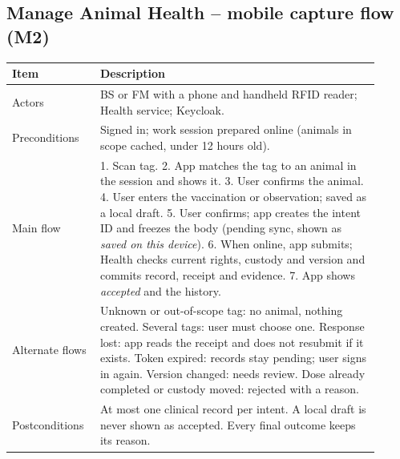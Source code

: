 \subsection*{Manage Animal Health -- mobile capture flow (M2)}

{\small
\begin{longtable}{|p{0.20\linewidth}|p{0.71\linewidth}|}
\hline
\textbf{Item} & \textbf{Description} \\ \hline
\endhead
Actors & BS or FM with a phone and handheld RFID reader; Health
service; Keycloak. \\ \hline
Preconditions & Signed in; work session prepared online (animals in
scope cached, under 12 hours old). \\ \hline
Main flow & 1. Scan tag. 2. App matches the tag to an animal in the
session and shows it. 3. User confirms the animal. 4. User enters the
vaccination or observation; saved as a local draft. 5. User confirms;
app creates the intent ID and freezes the body (pending sync, shown as
\emph{saved on this device}). 6. When online, app submits; Health
checks current rights, custody and version and commits record, receipt
and evidence. 7. App shows \emph{accepted} and the history. \\ \hline
Alternate flows & Unknown or out-of-scope tag: no animal, nothing
created. Several tags: user must choose one. Response lost: app reads
the receipt and does not resubmit if it exists. Token expired: records
stay pending; user signs in again. Version changed: needs review.
Dose already completed or custody moved: rejected with a reason. \\ \hline
Postconditions & At most one clinical record per intent. A local draft
is never shown as accepted. Every final outcome keeps its reason. \\ \hline
\end{longtable}
}